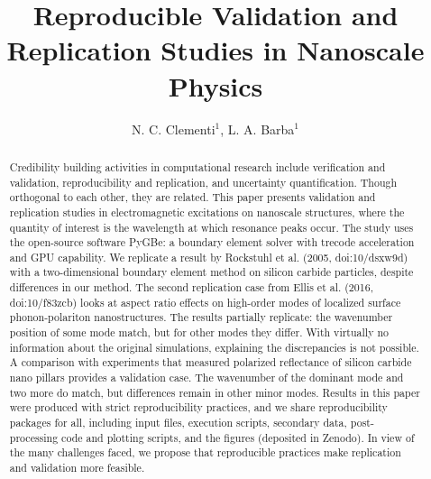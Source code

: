 \documentclass{rstransa} %
\begin{document}
\title{Reproducible Validation and Replication Studies in Nanoscale Physics}

\author{%
N. C. Clementi$^{1}$, L. A. Barba$^{1}$}

\address{$^{1}$Department of Mechanical and Aerospace Engineering, 
The George Washington University, Washington D.C., USA }

\subject{computer modeling and simulation, computational physics}



\begin{abstract}
    Credibility building activities in computational research include
    verification and validation, reproducibility and replication, and
    uncertainty quantification. Though orthogonal to each other, they are
    related. This paper presents validation and replication studies in 
    electromagnetic excitations on nanoscale structures, where the quantity
    of interest is the wavelength at which resonance peaks occur. 
    The study uses the open-source software PyGBe: a boundary element
    solver with trecode acceleration and GPU capability.
    We replicate a result by Rockstuhl et al. (2005, doi:10/dsxw9d) with a
    two-dimensional boundary element method on silicon carbide particles,
    despite differences in our method. 
    The second replication case from Ellis et al. (2016, doi:10/f83zcb) looks
    at aspect ratio effects on high-order modes of localized surface phonon-polariton
    nanostructures. The results partially replicate: the wavenumber
    position of some mode match, but for other modes they differ.
    With virtually no information about the original simulations, 
    explaining the discrepancies is not possible. 
    A comparison with experiments that measured polarized reflectance 
    of silicon carbide nano pillars provides a validation case.
    The wavenumber of the dominant mode and two more do match, but 
    differences remain in other minor modes. 
    Results in this paper were produced with strict reproducibility
    practices, and we share reproducibility packages for all, including
    input files, execution scripts, secondary data, post-processing code and
    plotting scripts, and the figures (deposited in Zenodo).
    In view of the many challenges faced, we propose that reproducible
    practices make replication and validation more feasible.

    \end{abstract}
    
\end{document}

